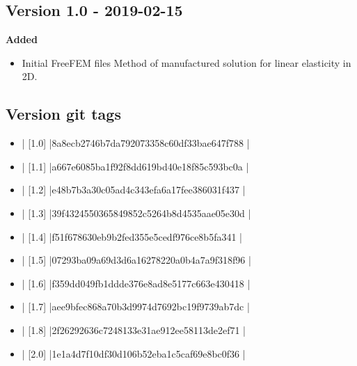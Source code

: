 \subsection{Version 1.0 - 2019-02-15}

\textbf{Added}
\begin{itemize}
\item Initial FreeFEM files  Method of manufactured solution for linear elasticity in 2D.
\end{itemize}

\subsection{Version git tags}
\begin{itemize}
\item | [1.0]      |8a8ecb2746b7da792073358c60df33bae647f788 |
\item | [1.1]     |a667e6085ba1f92f8dd619bd40e18f85c593bc0a |
\item | [1.2]        |e48b7b3a30c05ad4c343efa6a17fee386031f437 |
\item | [1.3]       |39f4324550365849852c5264b8d4535aae05e30d |
\item | [1.4]        |f51f678630eb9b2fed355e5cedf976ce8b5fa341 |
\item | [1.5]        |07293ba09a69d3d6a16278220a0b4a7a9f318f96 |
\item | [1.6]        |f359dd049fb1ddde376e8ad8e5177c663e430418 |
\item | [1.7]       |aee9bfec868a70b3d9974d7692bc19f9739ab7dc |
\item | [1.8]       |2f26292636c7248133e31ae912ee58113de2ef71 |
\item | [2.0]       |1e1a4d7f10df30d106b52eba1c5caf69e8bc0f36 |
\end{itemize}
\pagebreak

